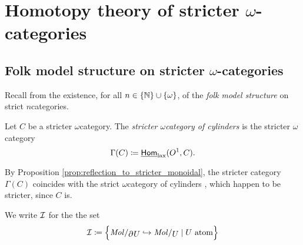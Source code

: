 \section{Homotopy theory of stricter \texorpdfstring{$\omega$}{ω}-categories} \label{sec:model}

\subsection{Folk model structure on stricter \texorpdfstring{$\omega$}{ω}-categories}

\noindent Recall from \cite{lafont2010folk} the existence, for all \( n \in \left\{ {\mathbb{N}} \right\} \cup \left\{ {\omega} \right\} \), of the \emph{folk model structure} on strict \( n \)\nbd categories.

\begin{dfn} 
    Let \( C \) be a stricter \( \omega \)\nbd category.
    The \emph{stricter \( \omega \)\nbd category of cylinders} is the stricter \( \omega \)\nbd category 
    \begin{equation*}
       \Gamma(C) \coloneqq \underline{\mathsf{Hom}}_{\mathrm{lax}}(O^{1}, C). 
    \end{equation*}
\end{dfn}

\begin{rmk} \label{rmk:strict_stricter_same_cylinders}
    By Proposition \ref{prop:reflection_to_stricter_monoidal}, the stricter category \( \Gamma(C) \) coincides with the strict \( \omega \)\nbd category of cylinders \cite[Remark 20.2.9]{ara2025polygraphs}, which happen to be stricter, since \( C \) is.
\end{rmk}

\begin{dfn}
    We write \( \mathcal{I} \) for the the set
    \begin{equation*}
        \Icof \eqdef \set{\molecin{\bd{}{}U} \incl \molecin{U} \mid U \text{ atom}}
    \end{equation*}
\end{dfn}

